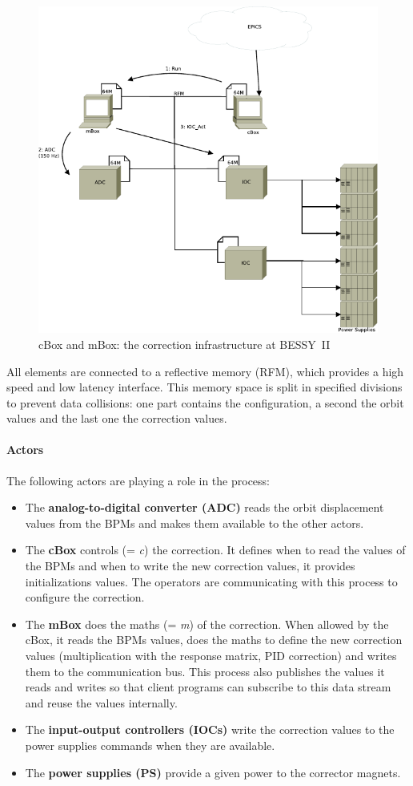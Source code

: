 \begin{figure}[!h]
    \centering
    \includegraphics[width=.85\linewidth]{img/mBox_cBox}
    \caption{\label{fig:cbox_mbox}cBox and mBox: the correction infrastructure at BESSY~II}
\end{figure}

All elements are connected to a reflective memory (RFM), which provides a high speed and low latency interface. This memory space is split in specified divisions to prevent data collisions: one part contains the configuration, a second the orbit values and the last one the correction values.

\paragraph{Actors}
The following actors are playing a role in the process:
\begin{itemize}
    \item The \textbf{analog-to-digital converter (ADC)} reads the orbit displacement values from the BPMs and makes them available to the other actors.
    \item The \textbf{cBox} controls (= \textit{c}) the correction. It defines when to read the values of the BPMs and when to write the new correction values, it provides initializations values. The operators are communicating with this process to configure the correction.
    \item The \textbf{mBox} does the maths (= \textit{m}) of the correction. When allowed by the cBox, it reads the BPMs values, does the maths to define the new correction values (multiplication with the response matrix, PID correction) and writes them to the communication bus. This process also publishes the values it reads and writes so that client programs can subscribe to this data stream and reuse the values internally.
    \item The \textbf{input-output controllers (IOCs)} write the correction values to the power supplies commands when they are available.
    \item The \textbf{power supplies (PS)} provide a given power to the corrector magnets.
\end{itemize}

